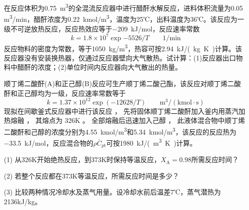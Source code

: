 \begin{frame}[t]{}
    \begin{example}
        在反应体积为\SI{0.75}{m^3}的全混流反应器中进行醋酐水解反应，进料体积流量为0.05 \si{m^3/min}，醋酐浓度为\SI{0.22}{kmol/m^3}，温度为25℃，出料温度为36℃。该反应为一级不可逆放热反应，反应热效应等于\SI{-209}{kJ/mol}，反应速率常数
        \[
            k=1.8 \times 10^7 \exp{-5526/T} \qquad 1/\mathrm{min}
        \]
        反应物料的密度为常数，等于\SI{1050}{kg/m^3}，热容可按\SI{2.94}{kJ/(kg.K)}计算。该反应器没有安装换热器，仅通过反应器壁向大气散热。试计算：(1)反应器出口物料中醋酐的浓度；(2)单位时间内反应器向大气散出的热量。        
    \end{example}

\end{frame}


\begin{frame}[t]{}
    \begin{example}
        顺丁烯二酸酐(A)和正己醇(B)反应可生产顺丁烯二酸己酯，该反应对顺丁烯二酸酐和正己醇均为一级，反应速率常数等于
        \[
            k = 1.37 \times 10^{12} \exp{(-12628/T)} \qquad \mathrm{m^3/(kmol \cdot s)}
        \]
        现拟在间歇釜式反应器中进行该反应 ， 先将固体顺丁烯二酸酐加入釜内用蒸汽加热熔融 ， 其熔点为 326K 。 全部熔融后迅速加入己醇 ， 此液体混合物中顺丁烯二酸酐和己醇的浓度分别为\SI{4.55}{kmol/m^3}和\SI{5.34}{kmol/m^3}，该反应的反应热为\SI{-33.5}{kJ/mol}，反应混合物的$\rho \bar{C}_{p \mathrm{t}}$可按\SI{1980}{kJ/(m^3.K)}计算。

        (1) 从326K开始绝热反应，到373K时保持等温反应，$X_\mathrm{A}=0.98$所需反应时间？

        (2) 若整个反应都在373K等温反应，所需反应时间是多少？

        (3) 比较两种情况冷却水及蒸气用量。设冷却水前后温差7℃，蒸气潜热为2136kJ/kg。
    \end{example}

\end{frame}



